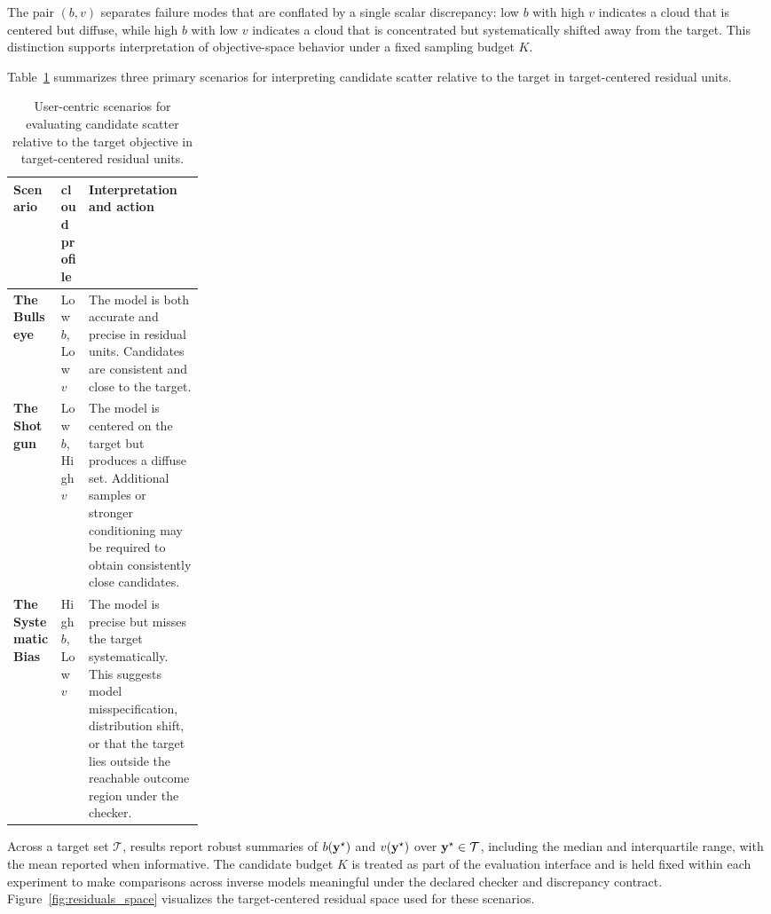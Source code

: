 The pair $(b,v)$ separates failure modes that are conflated by a single scalar discrepancy: low $b$
with high $v$ indicates a cloud that is centered but diffuse, while high $b$ with low $v$ indicates a
cloud that is concentrated but systematically shifted away from the target. This distinction supports
interpretation of objective-space behavior under a fixed sampling budget $K$.

Table~\ref{tab:user_decision_scenarios} summarizes three primary scenarios for interpreting candidate
scatter relative to the target in target-centered residual units.

\begin{table}[!htbp]
\centering
\small
\setlength{\tabcolsep}{5pt}
\renewcommand{\arraystretch}{1.6}
\begin{tabularx}{\linewidth}{@{} >{\raggedright\arraybackslash}p{0.25\linewidth} l X @{}}
\toprule
Scenario & cloud profile & Interpretation and action \\
\midrule
\textbf{The Bullseye} & Low $b$, Low $v$ &
The model is both accurate and precise in residual units. Candidates are consistent and close to the target. \\

\textbf{The Shotgun} & Low $b$, High $v$ &
The model is centered on the target but produces a diffuse set. Additional samples or stronger conditioning may be required to obtain consistently close candidates. \\

\textbf{The Systematic Bias} & High $b$, Low $v$ &
The model is precise but misses the target systematically. This suggests model misspecification, distribution shift, or that the target lies outside the reachable outcome region under the checker. \\
\bottomrule
\end{tabularx}
\caption{User-centric scenarios for evaluating candidate scatter relative to the target objective in target-centered residual units.}
\label{tab:user_decision_scenarios}
\end{table}

Across a target set $\mathcal{T}$, results report robust summaries of $b(\mathbf{y}^{\star})$ and
$v(\mathbf{y}^{\star})$ over $\mathbf{y}^{\star}\in\mathcal{T}$, including the median and interquartile
range, with the mean reported when informative. The candidate budget $K$ is treated as part of the
evaluation interface and is held fixed within each experiment to make comparisons across inverse
models meaningful under the declared checker and discrepancy contract. Figure~\ref{fig:residuals_space}
visualizes the target-centered residual space used for these scenarios.

